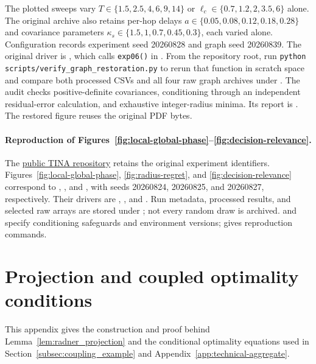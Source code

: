 The plotted sweeps vary $T\in\{1.5,2.5,4,6,9,14\}$ or
$\ell_c\in\{0.7,1.2,2,3.5,6\}$ alone. The original archive also retains
per-hop delays $a\in\{0.05,0.08,0.12,0.18,0.28\}$ and covariance parameters
$\kappa_s\in\{1.5,1,0.7,0.45,0.3\}$, each varied alone.
Configuration  records experiment
seed 20260828 and graph seed 20260839. The original driver is
, which calls
\texttt{exp06()} in .
From the repository root, run \texttt{python scripts/verify\_graph\_restoration.py}
to rerun that function in scratch space and compare both processed CSVs and
all four raw graph archives under .
The audit checks positive-definite covariances, conditioning through an
independent residual-error calculation, and exhaustive integer-radius minima.
Its report is .
The restored figure reuses the original PDF bytes.

\paragraph{Reproduction of Figures~\ref{fig:local-global-phase}--\ref{fig:decision-relevance}.}
The \href{https://github.com/ANRGUSC/TINA}{public TINA repository} retains
the original experiment identifiers. Figures~\ref{fig:local-global-phase},
\ref{fig:radius-regret}, and \ref{fig:decision-relevance} correspond to
,
, and
, with seeds 20260824, 20260825,
and 20260827, respectively. Their drivers are
,
, and
.
Run metadata, processed results, and selected raw arrays are stored under
; not every random draw is archived.
 and 
specify conditioning safeguards and environment versions;
 gives reproduction commands.


\section{Projection and coupled optimality conditions}
\label{app:technical-projection}
This appendix gives the construction and proof behind Lemma~\ref{lem:radner_projection}
and the conditional optimality equations used in Section~\ref{subsec:coupling_example}
and Appendix~\ref{app:technical-aggregate}.

